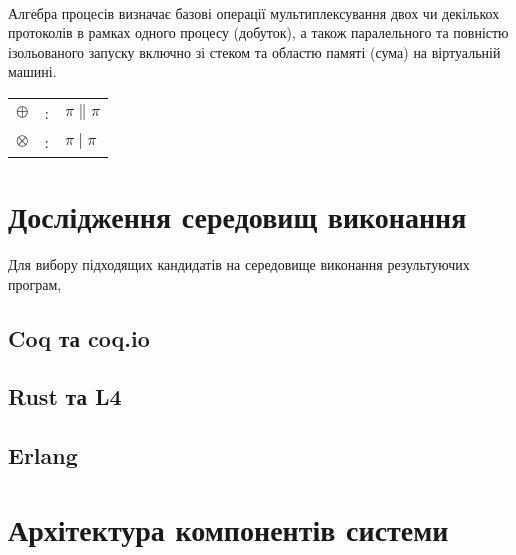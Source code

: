 \begin{prooftree}
\end{prooftree}
\paragraph{}

    \paragraph{}
    Алгебра процесів визначає базові операції мультиплексування двох чи декількох
    протоколів в рамках одного процесу (добуток), а також паралельного та повністю
    ізольованого запуску включно зі стеком та областю памяті (сума) на
    віртуальній машині.

\begin{center}
\begin{tabular}{lcl}
$\oplus$   &:& $\pi \parallel \pi$\\
$\otimes$  &:& $\pi \mid \pi$\\
\end{tabular}
\end{center}

\newpage
\section{Дослідження середовищ виконання}

Для вибору підходящих кандидатів на середовище виконання результуючих програм,

\subsection{Coq та coq.io}

\subsection{Rust та L4}

\subsection{Erlang}

\section{Архітектура компонентів системи}

